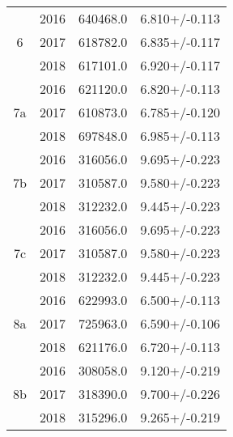 \begin{table}
\begin{tabular}{cccc}
\cline{1-4}
\multirow{3}{*}{6} & 2016 &         640468.0 &            6.810+/-0.113 \\
   & 2017 &         618782.0 &            6.835+/-0.117 \\
   & 2018 &         617101.0 &            6.920+/-0.117 \\
\cline{1-4}
\multirow{3}{*}{7a} & 2016 &         621120.0 &            6.820+/-0.113 \\
   & 2017 &         610873.0 &            6.785+/-0.120 \\
   & 2018 &         697848.0 &            6.985+/-0.113 \\
\cline{1-4}
\multirow{3}{*}{7b} & 2016 &         316056.0 &            9.695+/-0.223 \\
   & 2017 &         310587.0 &            9.580+/-0.223 \\
   & 2018 &         312232.0 &            9.445+/-0.223 \\
\cline{1-4}
\multirow{3}{*}{7c} & 2016 &         316056.0 &            9.695+/-0.223 \\
   & 2017 &         310587.0 &            9.580+/-0.223 \\
   & 2018 &         312232.0 &            9.445+/-0.223 \\
\cline{1-4}
\multirow{3}{*}{8a} & 2016 &         622993.0 &            6.500+/-0.113 \\
   & 2017 &         725963.0 &            6.590+/-0.106 \\
   & 2018 &         621176.0 &            6.720+/-0.113 \\
\cline{1-4}
\multirow{3}{*}{8b} & 2016 &         308058.0 &            9.120+/-0.219 \\
   & 2017 &         318390.0 &            9.700+/-0.226 \\
   & 2018 &         315296.0 &            9.265+/-0.219 \\
\bottomrule
\end{tabular}
\end{table}
